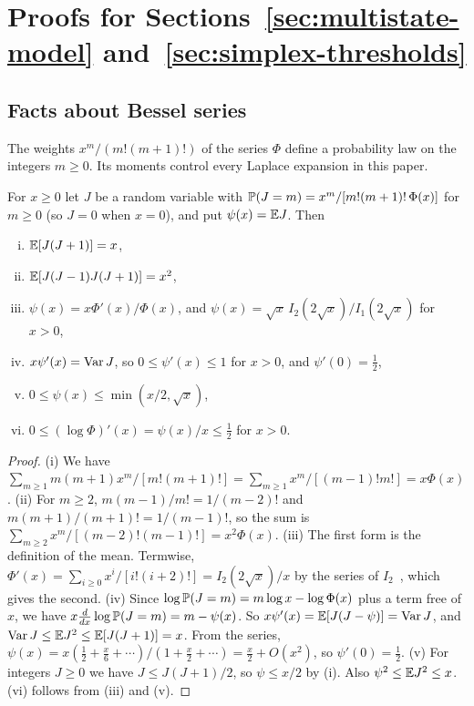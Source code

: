 \section{\texorpdfstring{Proofs for Sections~\ref{sec:multistate-model}
and~\ref{sec:simplex-thresholds}}{Proofs for Sections 2 and 3}}\label{app:thresholds}

\subsection{Facts about Bessel series}

The weights $x^m/(m!(m+1)!)$ of the series $\Phi$ define a probability law on
the integers $m\ge0$. Its moments control every Laplace expansion in this
paper.

\begin{lemma}\label{lem:bessel-law}
For $x\ge0$ let $J$ be a random variable with
$\mathbb P(J=m)=x^m/[m!(m+1)!\,\Phi(x)]$ for $m\ge0$ (so $J=0$ when $x=0$), and put
$\psi(x)=\mathbb E J$. Then
\begin{enumerate}[(i)]
\item $\mathbb E[J(J+1)]=x$,
\item $\mathbb E[J(J-1)J(J+1)]=x^2$,
\item $\psi(x)=x\Phi'(x)/\Phi(x)$, and $\psi(x)=\sqrt x\,I_2(2\sqrt x)/I_1(2\sqrt x)$
for $x>0$,
\item $x\psi'(x)=\operatorname{Var} J$, so $0\le\psi'(x)\le1$ for $x>0$, and $\psi'(0)=\frac12$,
\item $0\le\psi(x)\le\min(x/2,\sqrt x)$,
\item $0\le(\log\Phi)'(x)=\psi(x)/x\le\frac12$ for $x>0$.
\end{enumerate}
\end{lemma}

\begin{proof}
(i) We have $\sum_{m\ge1}m(m+1)x^m/[m!(m+1)!]=\sum_{m\ge1}x^m/[(m-1)!m!]=x\Phi(x)$.
(ii) For $m\ge2$, $m(m-1)/m!=1/(m-2)!$ and $m(m+1)/(m+1)!=1/(m-1)!$, so the sum is
$\sum_{m\ge2}x^m/[(m-2)!(m-1)!]=x^2\Phi(x)$.
(iii) The first form is the definition of the mean. Termwise,
$\Phi'(x)=\sum_{i\ge0}x^i/[i!(i+2)!]=I_2(2\sqrt x)/x$ by the series of
$I_2$~\cite[Eq.~10.25.2]{dlmf}, which gives the second.
(iv) Since $\log\mathbb P(J=m)=m\log x-\log\Phi(x)$ plus a term free of $x$, we
have $x\frac d{dx}\log\mathbb P(J=m)=m-\psi(x)$. So $x\psi'(x)=\mathbb E[J(J-\psi)]=\operatorname{Var} J$,
and $\operatorname{Var} J\le\mathbb E J^2\le\mathbb E[J(J+1)]=x$. From the series,
$\psi(x)=x(\frac12+\frac x6+\cdots)/(1+\frac x2+\cdots)=\frac x2+O(x^2)$, so
$\psi'(0)=\frac12$.
(v) For integers $J\ge0$ we have $J\le J(J+1)/2$, so $\psi\le x/2$ by (i). Also
$\psi^2\le\mathbb E J^2\le x$.
(vi) follows from (iii) and (v).
\end{proof}

